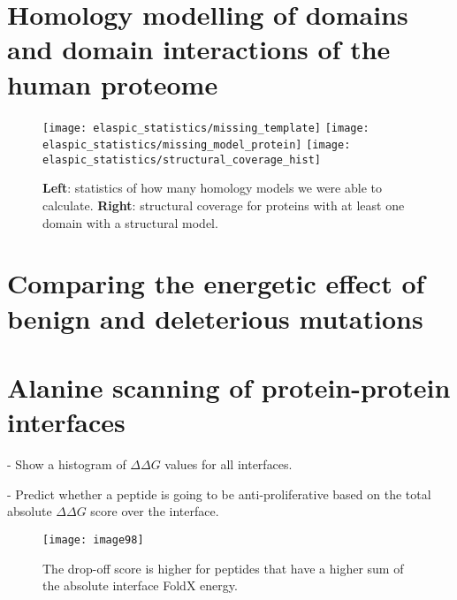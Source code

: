 
\section{Homology modelling of domains and domain interactions of the human proteome}

\begin{figure}[H]
	\centering
	\texttt{[image: elaspic\_statistics/missing\_template]}
	\texttt{[image: elaspic\_statistics/missing\_model\_protein]}
	\texttt{[image: elaspic\_statistics/structural\_coverage\_hist]}
	\caption{\textbf{Left}: statistics of how many homology models we were able to calculate. \textbf{Right}: structural coverage for proteins with at least one domain with a structural model.}
\end{figure}



\section{Comparing the energetic effect of benign and deleterious mutations}



\section{Alanine scanning of protein-protein interfaces}

- Show a histogram of $\Delta \Delta G$ values for all interfaces.

- Predict whether a peptide is going to be anti-proliferative based on the total absolute $\Delta \Delta G$ score over the interface.



\begin{figure}[H]
	\centering
	\texttt{[image: image98]}
	\caption[pipeline]{The drop-off score is higher for peptides that have a higher sum of the absolute interface FoldX energy.}
\end{figure}





